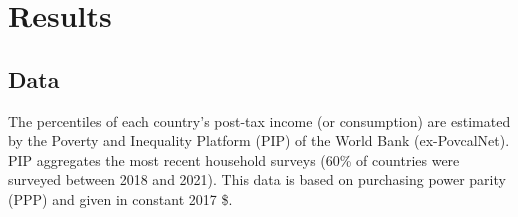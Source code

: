 \section{Results}
\subsection{Data}\label{subsec:data}
The percentiles of each country's post-tax income (or consumption) are estimated by the Poverty and Inequality Platform (PIP) of the World Bank (ex-PovcalNet). PIP aggregates the most recent household surveys (60\% of countries were surveyed between 2018 and 2021). This data is based on purchasing power parity (PPP) and given in constant 2017 \$. 

